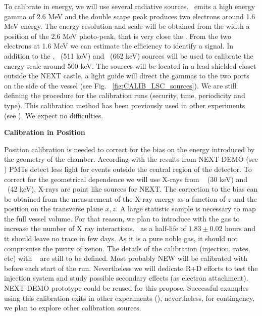 To calibrate in energy, we will use several radiative sources.
\Tl ~emits a high energy gamma of 2.6 MeV and the double scape peak produces two electrons around 1.6 MeV energy.
The energy resolution and scale will be obtained from the width a position of the 2.6 MeV photo-peak, that is very close the \Qbb. 
From the two electrons at 1.6 MeV we can estimate the efficiency to identify a \bb signal.  
In addition to the \Tl, \NA ~(511 keV) and \CS ~(662 keV)  sources will be used to calibrate the energy scale around 500 keV. 
The sources will be located in a lead shielded closet outside the NEXT castle, a light guide will direct the gammas to the two ports on the side of the vessel  (see Fig. ~\ref{fig:CALIB_LSC_sources}). 
We are still defining the procedure for the calibration runs (security, time, periodicity and type). This calibration method has been previously used in other \bb experiments (see \cite{COURE-Tl}). We expect no difficulties. 

{\bf Calibration in Position}

Position calibration is needed to correct for the bias on the energy introduced by the geometry of the chamber. According with the results from NEXT-DEMO (see \cite{NEXT-DEMO}) PMTs detect less light for events outside the central region of the detector. To correct for the geometrical dependence we will use X-rays from \Xe ~ (30 keV)  and \KR ~(42 keV). X-rays are point like sources for NEXT.
The correction to the bias can be obtained from the measurement of the X-ray energy as a function of $z$ and the position on the transverse plane $x,z$.
A large statistic sample is necessary to map the full vessel volume.
For that reason, we plan to introduce \KR with the \Xe gas to increase the number of X ray interactions.  \KR ~as a half-life of $1.83 \pm 0.02$ hours and
tt should leave no trace in few days. 
As it is a pure noble gas, it should not compromise the purity of xenon.
The details of the calibration (injection, rates, etc) with \KR~ are still to be defined.
Most probably NEW will be calibrated with \KR~ before each start of the run.
Nevertheless we will dedicate R+D efforts to test the injection system and study possible secondary effects (as electron attachment). NEXT-DEMO prototype could be reused for this propose. 
Successful examples using this calibration exits in other experiments (\cite{KR}), nevertheless, for contingency, we plan to explore other calibration sources. 

